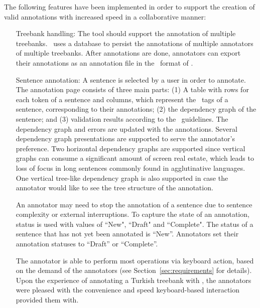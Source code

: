 The following features have been implemented in order to support the creation of valid annotations with increased speed in a collaborative manner:
\begin{itemize}[before=\normalfont, font=\itshape, align=left,noitemsep,topsep=0pt,parsep=3pt,partopsep=0pt,labelsep=3pt,align=left]
    \item[Treebank handling:]
        The tool should support the annotation of multiple treebanks.
        \boatvtwo\ uses a database to persist the annotations of multiple annotators of multiple treebanks.
        After annotations are done, annotators can export their annotations as an annotation file in the \conllu\ format of \ud.

    \item[Sentence annotation:]
    	A sentence is selected by a user in order to annotate.
        The annotation page consists of three main parts: (1) A table with rows for each token of a sentence and columns, which represent the \ud\ tags of a sentence, corresponding to their annotations; (2) the dependency graph of the sentence; and (3) validation results according to the \ud\ guidelines.
        The dependency graph and errors are updated with the annotations.
        Several dependency graph presentations are supported to serve the annotator's preference.
        Two horizontal dependency graphs are supported since vertical graphs can consume a significant amount of screen real estate, which leads to loss of focus in long sentences commonly found in agglutinative languages.
        One vertical tree-like dependency graph is also supported in case the annotator would like to see the tree structure of the annotation.

        An annotator may need to stop the annotation of a sentence due to sentence complexity or external interruptions.
        To capture the state of an annotation, status is used with values of ``New", ``Draft" and ``Complete".
        The status of a sentence that has not yet been annotated is ``New''.
	    Annotators set their annotation statuses to ``Draft'' or ``Complete''.

        The annotator is able to perform most operations via keyboard action, based on the demand of the annotators (see Section~\ref{sec:requirements} for details).
        Upon the experience of annotating a Turkish treebank with \boatvone, the annotators were pleased with the convenience and speed keyboard-based interaction provided them with.


\end{itemize}
